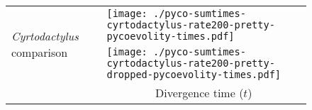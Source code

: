 \documentclass[border=10pt,varwidth=30cm]{standalone}
\begin{document}
\begin{figure}
    \centering
    \begin{tabular}{@{}ll@{}}
        \multirow{2}{*}[2em]{\begin{sideways}\textsl{Cyrtodactylus} comparison\end{sideways}}
        & \texttt{[image: ./pyco-sumtimes-cyrtodactylus-rate200-pretty-pycoevolity-times.pdf]} \\
        & \texttt{[image: ./pyco-sumtimes-cyrtodactylus-rate200-pretty-dropped-pycoevolity-times.pdf]} \\
        & \multicolumn{1}{c}{\hspace{6em}Divergence time ($t$)} \\
    \end{tabular}
\end{figure}
\end{document}
